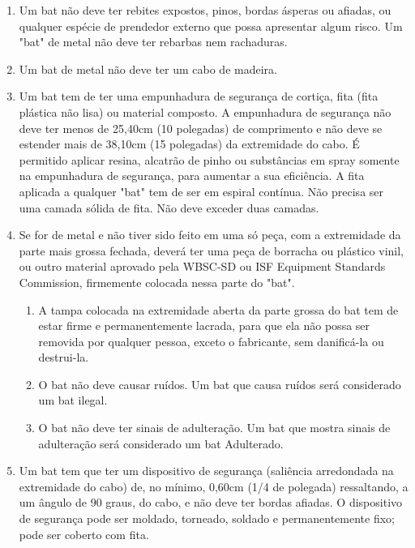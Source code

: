 \begin{multicols}{2}
\begin{enumerate}[label= \arabic*)]
		\item  Um \gls{bat} n\~ao deve ter rebites expostos, pinos, bordas \'asperas ou afiadas, ou qualquer esp\'ecie de prendedor externo que possa apresentar algum risco. Um "bat" de metal n\~ao deve ter rebarbas nem rachaduras. 
		\item  Um \gls{bat} de metal n\~ao deve ter um cabo de madeira. 
		\item  Um \gls{bat} tem de ter uma empunhadura de seguran\c{c}a de corti\c{c}a, fita (fita pl\'astica n\~ao lisa) ou material composto. A empunhadura de seguran\c{c}a n\~ao deve ter menos de 25,40cm (10 polegadas) de comprimento e n\~ao deve se estender mais de 38,10cm (15 polegadas) da extremidade do cabo. É permitido aplicar resina, alcatr\~ao de pinho ou subst\^ancias em spray somente na empunhadura de seguran\c{c}a, para aumentar a sua efici\^encia. A fita aplicada a qualquer "bat" tem de ser em espiral contínua. N\~ao precisa ser uma camada s\'olida de fita. N\~ao deve exceder duas camadas. 
		\item  Se for de metal e n\~ao tiver sido feito em uma s\'o pe\c{c}a, com a extremidade da parte mais grossa fechada, dever\'a ter uma pe\c{c}a de borracha ou pl\'astico vinil, ou outro material aprovado pela WBSC-SD ou ISF Equipment Standards Commission, firmemente colocada nessa parte do "bat". 
		
		\begin{enumerate}[label=\roman*.]
			\item A tampa colocada na extremidade aberta da parte grossa do \gls{bat} tem de estar firme e permanentemente lacrada, para que ela n\~ao possa ser removida por qualquer pessoa, exceto o fabricante, sem danific\'a-la ou destrui-la. 
			\item O \gls{bat} n\~ao deve causar ruídos. Um \gls{bat} que causa ruídos ser\'a considerado um \gls{bat} ilegal. 
			\item O \gls{bat} n\~ao deve ter sinais de adultera\c{c}\~ao. Um \gls{bat} que mostra sinais de adultera\c{c}\~ao ser\'a considerado um \gls{bat} Adulterado. 
		\end{enumerate}
		\item  Um \gls{bat} tem que ter um dispositivo de seguran\c{c}a (sali\^encia arredondada na extremidade do cabo) de, no mínimo, 0,60cm (1/4 de polegada) ressaltando, a um \^angulo de 90 graus, do cabo, e n\~ao deve ter bordas afiadas. O dispositivo de seguran\c{c}a pode ser moldado, torneado, soldado e permanentemente fixo; pode ser coberto com fita. 
		

\end{enumerate}
\end{multicols}
